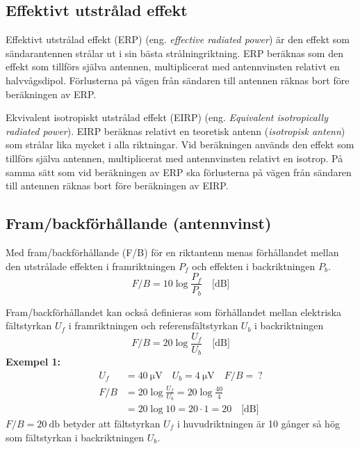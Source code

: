 \subsection{Effektivt utstrålad effekt}

Effektivt utstrålad effekt (ERP) (eng. \emph{effective radiated power}) är den
effekt som sändarantennen strålar ut i sin bästa strålningriktning.
ERP beräknas som den effekt som tillförs själva antennen, multiplicerat med
antennvinsten relativt en halvvågsdipol.
Förlusterna på vägen från sändaren till antennen räknas bort före beräkningen av
ERP.

Ekvivalent isotropiskt utstrålad effekt (EIRP)
(eng. \emph{Equivalent isotropically radiated power}).
EIRP beräknas relativt en teoretisk antenn (\emph{isotropisk antenn}) som
strålar lika mycket i alla riktningar.
Vid beräkningen används den effekt som tillförs själva antennen, multiplicerat
med antennvinsten relativt en isotrop.
På samma sätt som vid beräkningen av ERP ska förlusterna på vägen från sändaren
till antennen räknas bort före beräkningen av EIRP.

\subsection{Fram/backförhållande (antennvinst)}

Med fram/backförhållande (F/B) för en riktantenn menas förhållandet mellan den
utstrålade effekten i framriktningen \(P_f\) och effekten i backriktningen
\(P_b\).
\[ F/B = 10 \log\frac{P_f}{P_b} \quad \text{[dB]} \]

Fram/backförhållandet kan också definieras som förhållandet mellan elektriska
fältstyrkan \(U_f\) i framriktningen och referensfältstyrkan \(U_b\) i
backriktningen
\[ F/B = 20 \log\frac{U_f}{U_b} \quad \text{[dB]} \]
\newpage %
\textbf{Exempel 1:}
\begin{align*}
  U_f &= \SI{40}{\micro\volt} \quad U_b = \SI{4}{\micro\volt} \quad F/B =\ ? \\
  F/B &= 20 \log\frac{U_f}{U_b} = 20 \log\frac{40}{4} \\
  &= 20 \log 10 = 20 \cdot 1 = 20 \quad \text{[dB]}
\end{align*}
\(F/B = \SI{20}{\decibel}\) betyder att fältstyrkan \(U_f\) i huvudriktningen är
10 gånger så hög som fältstyrkan i backriktningen \(U_b\).

